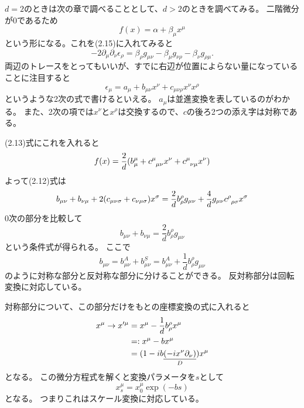 \documentclass[../../master.tex]{subfiles}
\begin{document}
\(d=2\)のときは次の章で調べることとして、\(d>2\)のときを調べてみる。
二階微分が\(0\)であるため
\begin{equation*}
    f(x) = \alpha + \beta_\mu x^\mu
\end{equation*}
という形になる。これを(2.15)に入れてみると
\begin{equation*}
    -2\partial_\mu\partial_\nu\epsilon_\rho = \beta_\rho g_{\mu\nu} - \beta_\mu g_{\nu\rho} -\beta_\nu g_{\rho\mu}.
\end{equation*}
両辺のトレースをとってもいいが、すでに右辺が位置によらない量になっていることに注目すると
\begin{equation}
    \epsilon_\mu = a_\mu + b_{\mu\nu}x^\nu + c_{\mu\nu\rho}x^\nu x^\rho
\end{equation}
というような2次の式で書けるといえる。
\(a_\mu\)は並進変換を表しているのがわかる。
また、2次の項では\(x^\nu\)と\(x^\rho\)は交換するので、\(c\)の後ろ2つの添え字は対称である。

(2.13)式にこれを入れると
\begin{equation*}
    f(x) = \frac{2}{d}(b_\mu^\mu+c\indices{^{\mu}_{\mu\nu}} x^\nu+c\indices{^{\mu}_{\nu\mu}} x^\nu)
\end{equation*}
よって(2.12)式は
\begin{equation*}
    b_{\mu\nu}+b_{\nu\mu}+ 2(c_{\mu\nu\sigma}+c_{\nu\mu\sigma})x^\sigma
    =\frac{2}{d}b_\rho^\rho g_{\mu\nu}+\frac{4}{d}g_{\mu\nu}c\indices{^{\rho}_{\rho\sigma}} x^\sigma
\end{equation*}
0次の部分を比較して
\begin{equation}
    b_{\mu\nu}+b_{\nu\mu} = \frac{2}{d}b_\rho^\rho g_{\mu\nu}
\end{equation}
という条件式が得られる。
ここで
\[
    b_{\mu\nu}=b_{\mu\nu}^A+b_{\mu\nu}^S=b_{\mu\nu}^A+\frac{1}{d}b_{\rho}^{\rho} g_{\mu\nu}
\]
のように対称な部分と反対称な部分に分けることができる。
反対称部分は回転変換に対応している。

対称部分について、この部分だけをもとの座標変換の式に入れると
\begin{align}
    x^\mu\rightarrow x'^\mu
    &= x^\mu - \frac{1}{d}b_{\rho}^{\rho} x^\mu\notag\\
    &=: x^\mu - b x^\mu\\
    &= (1 -ib\underset{D}{\underline{(-ix^\nu\partial_\nu)}})x^\mu \notag
\end{align}
となる。
この微分方程式を解くと変換パラメータを\(s\)として
\begin{equation*}
    x_s^\mu = x_0^\mu \exp(-bs)
\end{equation*}
となる。
つまりこれはスケール変換に対応している。
\end{document}
